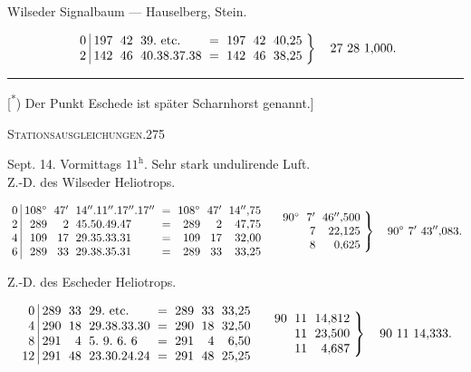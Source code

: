 \begin{center}Wilseder Signalbaum --- Hauselberg, Stein.\end{center}
\[
\setlength{\arraycolsep}{3pt}
\left.\begin{array}{r|rrlcrrr}
0&197&42&39.\ \text{etc.}&=&197&42&40{,}25\\
2&142&46&40.38.37.38&=&142&46&38{,}25
\end{array}\right\}\quad27\ 28\ 1{,}000.
\]
\vfill\noindent\rule{\textwidth}{.4pt}\par
{\footnotesize [\textsuperscript{*}) Der Punkt Eschede ist später Scharnhorst genannt.]}

\clearpage
\noindent\mbox{}\hfill\textsc{Stationsausgleichungen.}\hfill275\par\bigskip
\begin{center}
Sept. 14. Vormittags $11^{\mathrm h}$. Sehr stark undulirende Luft.\\[4pt]
Z.-D. des Wilseder Heliotrops.
\end{center}
\[
\setlength{\arraycolsep}{3pt}
\begin{array}{r|rrlcrrr}
0&108^\circ&47'&14''.11''.17''.17''&=&108^\circ&47'&14''{,}75\\
2&289&2&45.50.49.47&=&289&2&47{,}75\\
4&109&17&29.35.33.31&=&109&17&32{,}00\\
6&289&33&29.38.35.31&=&289&33&33{,}25
\end{array}
\quad
\left.\begin{array}{rrr}
90^\circ&7'&46''{,}500\\&7&22{,}125\\&8&0{,}625
\end{array}\right\}\quad90^\circ\ 7'\ 43''{,}083.
\]
\begin{center}Z.-D. des Escheder Heliotrops.\end{center}
\[
\setlength{\arraycolsep}{3pt}
\begin{array}{r|rrlcrrr}
0&289&33&29.\ \text{etc.}&=&289&33&33{,}25\\
4&290&18&29.38.33.30&=&290&18&32{,}50\\
8&291&4&5.\ 9.\ 6.\ 6&=&291&4&6{,}50\\
12&291&48&23.30.24.24&=&291&48&25{,}25
\end{array}
\quad
\left.\begin{array}{rrr}
90&11&14{,}812\\&11&23{,}500\\&11&4{,}687
\end{array}\right\}\quad90\ 11\ 14{,}333.
\]
